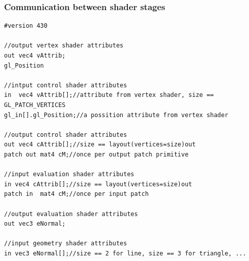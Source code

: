 \begin{frame}[fragile]
\frametitle{Communication between shader stages}
{\tiny
\begin{verbatim}
#version 430

//output vertex shader attributes
out vec4 vAttrib;
gl_Position

//intput control shader attributes
in  vec4 vAttrib[];//attribute from vertex shader, size == GL_PATCH_VERTICES
gl_in[].gl_Position;//a possition attribute from vertex shader

//output control shader attributes
out vec4 cAttrib[];//size == layout(vertices=size)out
patch out mat4 cM;//once per output patch primitive

//input evaluation shader attributes
in vec4 cAttrib[];//size == layout(vertices=size)out
patch in  mat4 cM;//once per input patch

//output evaluation shader attributes
out vec3 eNormal;

//input geometry shader attributes
in vec3 eNormal[];//size == 2 for line, size == 3 for triangle, ...
	\end{verbatim}
	}
\end{frame}

